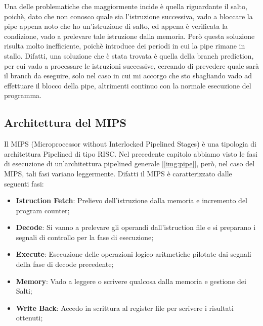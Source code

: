 Una delle problematiche che maggiormente incide è quella riguardante il salto, poichè, dato che non conosco quale sia l'istruzione successiva, vado a bloccare la pipe appena noto che ho un'istruzione di salto, ed appena è verificata la condizione, vado a prelevare tale istruzione dalla memoria. Però questa soluzione risulta molto inefficiente, poichè introduce dei periodi in cui la pipe rimane in stallo. Difatti, una soluzione che è stata trovata è quella della branch prediction, per cui vado a processare le istruzioni successive, cercando di prevedere quale sarà il branch da eseguire, solo nel caso in cui mi accorgo che sto sbagliando vado ad effettuare il blocco della pipe, altrimenti continuo con la normale esecuzione del programma.

\subsection{Architettura del MIPS}
Il MIPS (Microprocessor without Interlocked Pipelined Stages) è una tipologia di architettura Pipelined di tipo RISC.
Nel precedente capitolo abbiamo visto le fasi di esecuzione di un'architettura pipelined generale [\ref{img:pipe}], però, nel caso del MIPS, tali fasi variano leggermente. Difatti il MIPS è caratterizzato dalle seguenti fasi:
\begin{itemize}
    \item \textbf{Istruction Fetch}: Prelievo dell'istruzione dalla memoria e incremento del program counter;
    \item \textbf{Decode}: Si vanno a prelevare gli operandi dall'istruction file e si preparano i segnali di controllo per la fase di esecuzione;
    \item \textbf{Execute}: Esecuzione delle operazioni logico-aritmetiche pilotate dai segnali della fase di decode precedente;
    \item \textbf{Memory}: Vado a leggere o scrivere qualcosa dalla memoria e gestione dei Salti;
    \item \textbf{Write Back}: Accedo in scrittura al register file per scrivere i risultati ottenuti;
\end{itemize}

